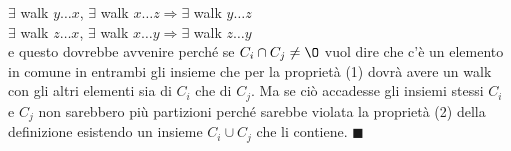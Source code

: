 \begin{demostration}
\begin{enumerate}
    $\exists$ walk $y \ldots x$, $\exists$ walk $x \ldots z \Longrightarrow \exists$ walk $y \ldots z$\\
    $\exists$ walk $z \ldots x$, $\exists$ walk $x \ldots y \Longrightarrow \exists$ walk $z \ldots y$ \\
    e questo dovrebbe avvenire perché se $C_i \cap C_j \neq \O$ vuol dire che c'è un elemento in comune in entrambi gli insieme che per la proprietà (1) dovrà avere un walk con gli altri elementi sia di $C_i$ che di $C_j$.
    Ma se ciò accadesse gli insiemi stessi $C_i$ e $C_j$ non sarebbero più partizioni perché sarebbe violata la proprietà (2) della definizione esistendo un insieme $C_i \cup C_j$ che li contiene. $\blacksquare$
\end{enumerate}
\end{demostration}

